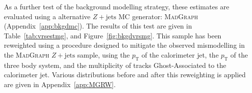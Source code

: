 \documentclass[NOTE, atlasdraft=true, texlive=2017, UKenglish]{\ATLASLATEXPATH atlasdoc}
\begin{document}

As a further test of the background modelling strategy, these estimates are evaluated using a alternative $Z+\text{jets}$ MC generator: \textsc{MadGraph} (Appendix~\ref{app:bkgdmc}). The results of this test are given in Table~\ref{tab:vrsestmg}, and Figure~\ref{fig:bkgdvrsmg}. This sample has been reweighted using a procedure designed to mitigate the observed mismodelling in the \textsc{MadGraph} $Z+\text{jets}$ sample, using the $p_\text{T}$ of the calorimeter jet, the $p_\text{T}$ of the three body system, and the multiplicity of tracks Ghost-Associated to the calorimeter jet. Various distributions before and after this reweighting is applied are given in Appendix~\ref{app:MGRW}. %
\end{document}
